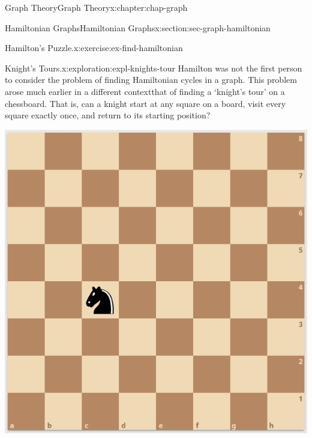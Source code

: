 \documentclass[oneside,10pt,]{book}
\numberwithin{equation}{section}
\begin{document}
\begin{chapterptx}{Graph Theory}{}{Graph Theory}{}{}{x:chapter:chap-graph}
\begin{sectionptx}{Hamiltonian Graphs}{}{Hamiltonian Graphs}{}{}{x:section:sec-graph-hamiltonian}
\begin{inlineexercise}{Hamilton's Puzzle.}{x:exercise:ex-find-hamiltonian}
\begin{sidebyside}{1}{0.375}{0.375}{0}
\begin{sbspanel}{0.25}
{
}%
\end{sbspanel}%
\end{sidebyside}%
\end{inlineexercise}
\begin{exploration}{Knight's Tours.}{x:exploration:expl-knights-tour}%
Hamilton was not the first person to consider the problem of finding Hamiltonian cycles in a graph. This problem arose much earlier in a different context\textemdash{}that of finding a `knight's tour' on a chessboard. That is, can a knight start at any square on a board, visit every square exactly once, and return to its starting position?%
\begin{sidebyside}{1}{0.275}{0.275}{0}%
\begin{sbspanel}{0.45}%
\includegraphics[width=\linewidth]{images/knight.PNG}

\end{sbspanel}
\end{sidebyside}
\end{exploration}
\end{sectionptx}
\end{chapterptx}
\end{document}
